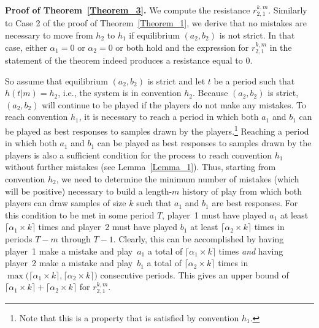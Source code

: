 \documentclass[11.5pt]{article}
\begin{document}
\textbf{Proof of Theorem~\ref{Theorem_3}.} 
We compute the resistance $r_{2,1}^{k,m}$. Similarly to Case 2 of the proof of Theorem~\ref{Theorem_1}, we derive that no mistakes are necessary to move from $h_2$ to $h_1$ if equilibrium $(a_2,b_2)$ is not strict. In that case, either $\alpha_1=0$ or $\alpha_2=0$ or both hold and the expression for $r_{2,1}^{k,m}$ in the statement of the theorem indeed produces a resistance equal to 0.  

So assume that equilibrium $(a_2,b_2)$ is strict and let $t$ be a period such that $h(t|m) = h_2$, i.e., the system is in convention $h_2$. 
Because $(a_2,b_2)$ is strict, $(a_2,b_2)$ will continue to be played if the players do not make any mistakes. To reach convention $h_1$, it is necessary to reach a period in which both $a_1$ and $b_1$ can be played as best responses to samples drawn by the players.\footnote{Note that this is a property that is satisfied by convention $h_1$.} 
Reaching a period in which both $a_1$ and $b_1$ can be played as best responses to samples drawn by the players is also a sufficient condition for the process to reach convention $h_1$ without further mistakes (see Lemma~\ref{Lemma_1}). 
%
Thus, starting from convention $h_2$, we need to determine the minimum number of mistakes (which will be positive) necessary to build a length-$m$ history of play from which both players can draw samples of size $k$ such that $a_1$ and $b_1$ are best responses. 
For this condition to be met in some period $T$, player~1 must have played $a_1$ at least $\lceil \alpha_1 \times k \rceil$ times and player~2 must have played $b_1$ at least $\lceil \alpha_2 \times k \rceil$ times in periods $T-m$ through $T-1$. 
%
Clearly, this can be accomplished by having player~1 make a mistake and play~$a_1$ a total of $\lceil \alpha_1 \times k \rceil$ times \emph{and} having player~2 make a mistake and play~$b_1$ a total of $\lceil \alpha_2 \times k \rceil$ times in $\max\big(\lceil \alpha_1 \times k \rceil,\lceil \alpha_2 \times k \rceil\big)$ consecutive periods. 
This gives an upper bound of $\lceil \alpha_1 \times k \rceil + \lceil \alpha_2 \times k \rceil$ for $r_{2,1}^{k,m}$.
%
\end{document}
